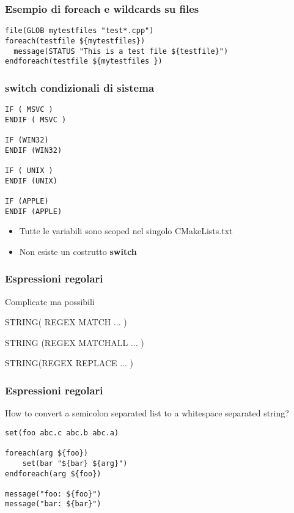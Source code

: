 \documentclass[12pt] {beamer}
\begin{document}

\begin{frame}[fragile]
\frametitle{Esempio di foreach e wildcards su files}
\begin{verbatim}
file(GLOB mytestfiles "test*.cpp")
foreach(testfile ${mytestfiles})
  message(STATUS "This is a test file ${testfile}")
endforeach(testfile ${mytestfiles })
\end{verbatim}
\end{frame}


\begin{frame}[fragile]
\frametitle{switch condizionali di sistema}
\begin{verbatim}
IF ( MSVC )
ENDIF ( MSVC )

IF (WIN32)
ENDIF (WIN32)
 		
IF ( UNIX )
ENDIF (UNIX)
 		
IF (APPLE)
ENDIF (APPLE)
\end{verbatim}
\begin{itemize}
\item Tutte le variabili sono scoped nel singolo CMakeLists.txt
\item Non esiste un costrutto \textbf{switch}
\end{itemize}
\end{frame}

\begin{frame}
	\frametitle{ Espressioni regolari}
	Complicate ma possibili
	
	STRING( REGEX MATCH ... )
	
	STRING (REGEX MATCHALL ... )
	
	STRING(REGEX REPLACE ... )
	
\end{frame}




\begin{frame}[fragile]
 \frametitle{ Espressioni regolari }
How to convert a semicolon separated list to a whitespace separated string?
\begin{verbatim}
set(foo abc.c abc.b abc.a)

foreach(arg ${foo})
    set(bar "${bar} ${arg}")
endforeach(arg ${foo})
 
message("foo: ${foo}")
message("bar: ${bar}")
\end{verbatim}
\end{frame}
\end{document}
